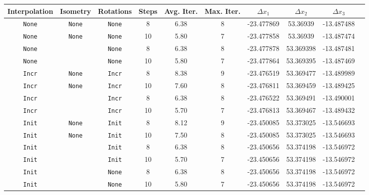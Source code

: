
\begin{tabular*}{\textwidth}{@{\extracolsep\fill}cccccccccc@{}}
\toprule
\textbf{Interpolation} & \textbf{Isometry} & \textbf{Rotations} &
\textbf{Steps} & \textbf{Avg. Iter.} & \textbf{Max. Iter.} &
  \(\Delta x_1\) & \(\Delta x_2\) & \(\Delta x_3\)
\\ %
\midrule
  \texttt{None} & \texttt{None} & \texttt{None} &  \hphantom{.}8 & 6.38 & 8 &  -23.477869   &   53.36939  &   -13.487488 \\ 
  \texttt{None} & \texttt{None} & \texttt{None} &             10 & 5.80 & 7 &  -23.477858   &   53.36939  &   -13.487474 \\ 
  \texttt{None} & \Spherical{} & \texttt{None} &  \hphantom{.}8 & 6.38 & 8 &  -23.477878   &   53.369398 &   -13.487481 \\ 
  \texttt{None} & \Spherical{} & \texttt{None} &             10 & 5.80 & 7 &  -23.477864   &   53.369395 &   -13.487469 \\ 
  \hline
  \texttt{Incr} & \texttt{None} & \texttt{Incr} &  \hphantom{.}8 & 8.38 & 9 &  -23.476519   &   53.369477 &   -13.489989 \\ 
  \texttt{Incr} & \texttt{None} & \texttt{Incr} &             10 & 7.60 & 8 &  -23.476811   &   53.369459 &   -13.489425 \\ 
  \texttt{Incr} & \Spherical{} & \texttt{Incr} &  \hphantom{.}8 & 6.38 & 8 &  -23.476522   &   53.369491 &   -13.490001 \\ 
  \texttt{Incr} & \Spherical{} & \texttt{Incr} &             10 & 5.70 & 7 &  -23.476813   &   53.369467 &   -13.489432 \\
  \hline
  \texttt{Init} & \texttt{None} & \texttt{Init} &  \hphantom{.}8 & 8.12 & 9 &  -23.450085   &   53.373025 &   -13.546693 \\ 
  \texttt{Init} & \texttt{None} & \texttt{Init} &             10 & 7.50 & 8 &  -23.450085   &   53.373025 &   -13.546693 \\
  \texttt{Init} & \Spherical{} & \texttt{Init} &  \hphantom{.}8 & 6.38 & 8 &  -23.450656   &   53.374198 &    -13.546972 \\
  \texttt{Init} & \Spherical{} & \texttt{Init} &             10 & 5.70 & 7 &  -23.450656   &   53.374198 &    -13.546972 \\
  \texttt{Init} & \Spherical{} & \texttt{None} &  \hphantom{.}8 & 6.38 & 8 &  -23.450656   &   53.374198 &    -13.546972 \\
  \texttt{Init} & \Spherical{} & \texttt{None} &             10 & 5.80 & 7 &  -23.450656   &   53.374198 &    -13.546972 \\
\bottomrule
\end{tabular*}

